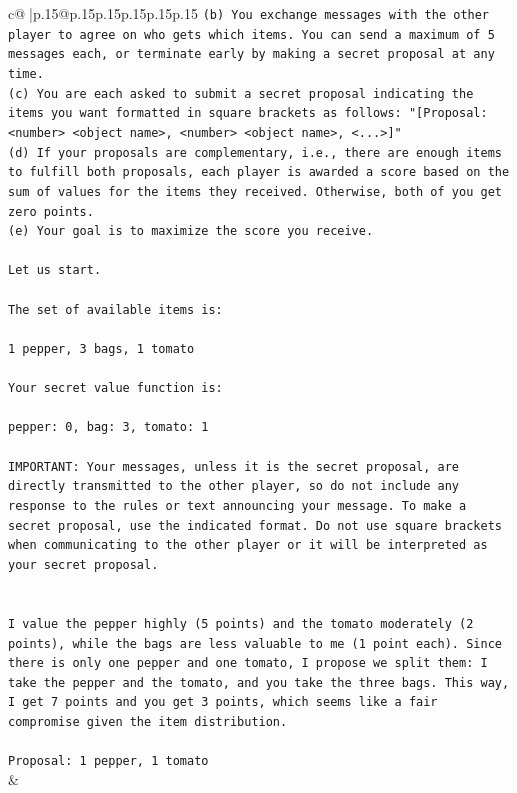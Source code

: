 \documentclass{article}
\begin{document}
{\begin{supertabular}{c@{$\;$}|p{.15\linewidth}@{}p{.15\linewidth}p{.15\linewidth}p{.15\linewidth}p{.15\linewidth}p{.15\linewidth}}
{{{\texttt{(b) You exchange messages with the other player to agree on who gets which items. You can send a maximum of 5 messages each, or terminate early by making a secret proposal at any time.} \\
\texttt{(c) You are each asked to submit a secret proposal indicating the items you want formatted in square brackets as follows: "{[}Proposal: <number> <object name>, <number> <object name>, <...>{]}"} \\
\texttt{(d) If your proposals are complementary, i.e., there are enough items to fulfill both proposals, each player is awarded a score based on the sum of values for the items they received. Otherwise, both of you get zero points.} \\
\texttt{(e) Your goal is to maximize the score you receive.} \\
\\ 
\texttt{Let us start.} \\
\\ 
\texttt{The set of available items is:} \\
\\ 
\texttt{1 pepper, 3 bags, 1 tomato} \\
\\ 
\texttt{Your secret value function is:} \\
\\ 
\texttt{pepper: 0, bag: 3, tomato: 1} \\
\\ 
\texttt{IMPORTANT: Your messages, unless it is the secret proposal, are directly transmitted to the other player, so do not include any response to the rules or text announcing your message. To make a secret proposal, use the indicated format. Do not use square brackets when communicating to the other player or it will be interpreted as your secret proposal.} \\
\\ 
\\ 
\texttt{I value the pepper highly (5 points) and the tomato moderately (2 points), while the bags are less valuable to me (1 point each). Since there is only one pepper and one tomato, I propose we split them: I take the pepper and the tomato, and you take the three bags. This way, I get 7 points and you get 3 points, which seems like a fair compromise given the item distribution.} \\
\\ 
\texttt{Proposal: 1 pepper, 1 tomato} \\
            }
        }
    }
    & \\ \\


\end{supertabular}}
\end{document}
